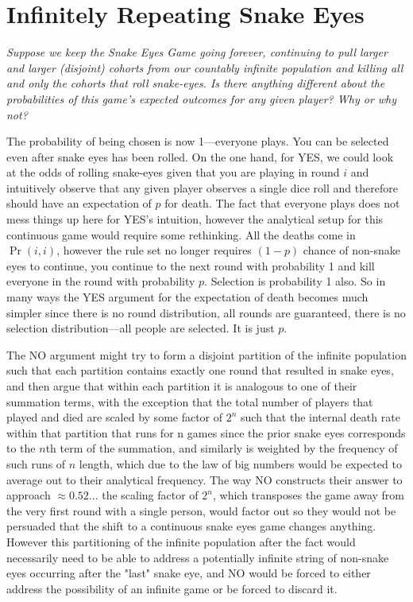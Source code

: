 \documentclass[article,twocolumn]{memoir}
\begin{document}
\chapter{Infinitely Repeating Snake Eyes}

\emph{Suppose we keep the Snake Eyes Game going forever, continuing to pull larger and larger (disjoint) cohorts from our countably infinite population and killing all and only the cohorts that roll snake-eyes. 
Is there anything different about the probabilities of this game’s expected outcomes for any given player? 
Why or why not?}

\vspace{1em}

The probability of being chosen is now 1---everyone plays.
You can be selected even after snake eyes has been rolled.
On the one hand, for YES, we could look at the odds of rolling snake-eyes given that you are playing in round $i$ and intuitively observe that any given player observes a single dice roll and therefore should have an expectation of $p$ for death.
The fact that everyone plays does not mess things up here for YES's intuition, however the analytical setup for this continuous game would require some rethinking.
All the deaths come in $\Pr(i,i)$, however the rule set no longer requires $(1-p)$ chance of non-snake eyes to continue, you continue to the next round with probability 1 and kill everyone in the round with probability $p$.
Selection is probability 1 also.
So in many ways the YES argument for the expectation of death becomes much simpler since there is no round distribution, all rounds are guaranteed, there is no selection distribution---all people are selected.
It is just $p$.

The NO argument might try to form a disjoint partition of the infinite population such that each partition contains exactly one round that resulted in snake eyes, and then argue that within each partition it is analogous to one of their summation terms, with the exception that the total number of players that played and died are scaled by some factor of $2^n$ such that the internal death rate within that partition that runs for n games since the prior snake eyes corresponds to the $n$th term of the summation, and similarly is weighted by the frequency of such runs of $n$ length, which due to the law of big numbers would be expected to average out to their analytical frequency.
The way NO constructs their answer to approach $\approx 0.52...$ the scaling factor of $2^n$, which transposes the game away from the very first round with a single person, would factor out so they would not be persuaded that the shift to a continuous snake eyes game changes anything. 
However this partitioning of the infinite population after the fact would necessarily need to be able to address a potentially infinite string of non-snake eyes occurring after the "last" snake eye, and NO would be forced to either address the possibility of an infinite game or be forced to discard it.
\end{document}
